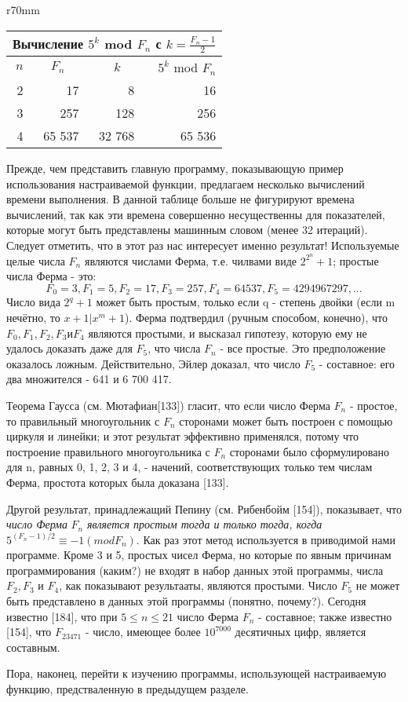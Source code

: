 \begin{wraptable}{r}{70mm}
\begin{tabular}{|r|r|r|r|}
\hline
\multicolumn{4}{|c|}{Вычисление $5^k$ mod $F_{n}$ с $k=\frac{F_{n}-1}{2}$}\\ \hline
$n$ & $F_{n}\;\;\;\;$ & $k\;\;\;\;$ & $5^k$ mod $F_{n}$\\ \hline
2 & 17 & 8 & 16\\
3 & 257 & 128 & 256\\
4 & 65 537 & 32 768 &65 536\\ \hline
\end{tabular}
\end{wraptable}
Прежде, чем представить главную программу, показывающую пример использования настраиваемой функции, предлагаем несколько вычислений времени выполнения. В данной таблице больше не фигурируют времена вычислений, так как эти времена совершенно несущественны для показателей, которые могут быть представлены машинным словом (менее 32 итераций). Следует отметить, что в этот раз нас интересует именно результат! Используемые целые числа $F_n$  являются числами Ферма, т.е. чилвами виде $2^{2^n} + 1$; простые числа Ферма - это:
 $$F_0 = 3, F_1 = 5, F_2 = 17, F_3 = 257, F_4 = 64 537, F_5 = 4 294 967 297,...$$
 \newpage
\noindent Число вида $2^q + 1$ может быть простым, только если q -  степень двойки (если m нечётно, то $x + 1 | x^m + 1$). Ферма подтвердил (ручным способом, конечно), что $F_0, F_1, F_2, F_3 и F_4$ являются простыми, и высказал гипотезу, которую ему не удалось доказать даже для $F_5$, что  числа $F_n$ - все простые. Это предположение оказалось ложным. Действительно, Эйлер доказал, что число $F_5$ - составное: его два множителся - 641 и 6 700 417.
 \par Теорема Гаусса (см. Мютафиан[133]) гласит, что если число Ферма $F_n$ - простое, то правильный многоугольник с $F_n$ сторонами может быть построен с помощью циркуля и линейки; и этот результат эффективно применялся, потому что построение правильного многоугольника с $F_n$ сторонами было сформулировано для  n, равных 0, 1, 2, 3 и 4, - начений, соответствующих только тем числам Ферма, простота которых была доказана [133].
 \par Другой результат, принадлежащий Пепину (см. Рибенбойм [154]), показывает, что {\it число Ферма} $F_n$ {\it является простым тогда и только тогда, когда} $5^{(F_n - 1)/2} \equiv -1 (mod F_n)$.  Как раз этот метод используется в приводимой нами программе. Кроме 3 и 5, простых чисел Ферма, но которые по явным причинам программирования (каким?) не входят в набор данных этой программы, числа $F_2, F_3$ и $F_4$, как показывают результааты, являются простыми. Число $F_5$ не может быть представлено в данных этой программы (понятно, почему?). Сегодня известно [184], что при $5 \leqslant n \leqslant 21$  число Ферма $F_n$ - составное; также известно [154], что $F_23471$ - число, имеющее более $10^7000$ десятичных цифр, является составным.
 \par Пора, наконец, перейти к изучению программы, использующей настраиваемую функцию, предстваленную в предыдущем разделе.
 
